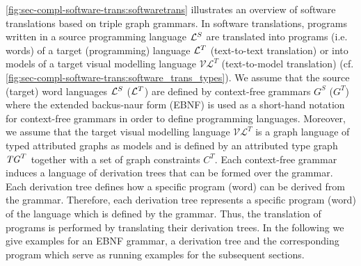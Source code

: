 \cref{fig:sec-compl-software-trans:softwaretrans} illustrates an overview of software translations based on triple graph grammars.
In software translations, programs written in a source programming language $\mathcal{L}^S$ are translated into programs (i.e. words) of a target (programming) language $\mathcal{L}^T$ (text-to-text translation) or into models of a target visual modelling language $\mathcal{VL}^T$ (text-to-model translation) (cf. \cref{fig:sec-compl-software-trans:software_trans_types}).
We assume that the source (target) word languages $\mathcal{L}^S$ ($\mathcal{L}^T$) are defined by context-free grammars $G^S$ ($G^T$) where the extended backus-naur form (EBNF) is used as a short-hand notation for context-free grammars in order to define programming languages.
Moreover, we assume that the target visual modelling language $\mathcal{VL}^T$ is a graph language of typed attributed graphs as models and is defined by an attributed type graph $\mathit{TG}^T$ together with a set of graph constraints $C^T$.
Each context-free grammar induces a language of derivation trees that can be formed over the grammar.
Each derivation tree defines how a specific program (word) can be derived from the grammar.
Therefore, each derivation tree represents a specific program (word) of the language which is defined by the grammar.
Thus, the translation of programs is performed by translating their derivation trees.
In the following we give examples for an EBNF grammar, a derivation tree and the corresponding program which serve as running examples for the subsequent sections.

